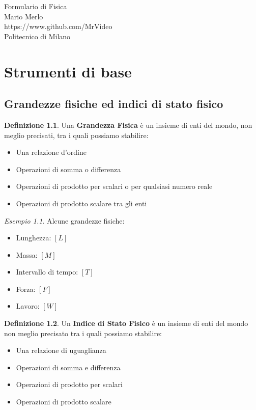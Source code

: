 \documentclass[a4paper, 12pt]{report}
\theoremstyle{definition}
\newtheorem{definition}{Definizione}[chapter]
\theoremstyle{remark}
\newtheorem{example}{Esempio}[definition]
\theoremstyle{plain}
\begin{document}
\begin{titlepage}
    \begin{center}
        \vspace*{5cm}
        \Huge{Formulario di Fisica}\\[1cm]
        \Large{Mario Merlo}\\
        \Large{https://www.github.com/MrVideo}\\
        \Large{Politecnico di Milano}\\[7,5cm]
    \end{center}
    \doclicenseThis
\end{titlepage}

\chapter{Strumenti di base}

\section{Grandezze fisiche ed indici di stato fisico}

\begin{definition}
    Una {\bf Grandezza Fisica} è un insieme di enti del mondo, non meglio precisati, tra i quali possiamo stabilire:
    \begin{itemize}
        \item Una relazione d'ordine
        \item Operazioni di somma o differenza
        \item Operazioni di prodotto per scalari o per qualsiasi numero reale
        \item Operazioni di prodotto scalare tra gli enti
    \end{itemize}
\end{definition}

\begin{example}
    Alcune grandezze fisiche:
    \begin{itemize}
        \item Lunghezza: $[L]$
        \item Massa: $[M]$
        \item Intervallo di tempo: $[T]$
        \item Forza: $[F]$
        \item Lavoro: $[W]$
    \end{itemize}
\end{example}

\begin{definition}
    Un {\bf Indice di Stato Fisico} è un insieme di enti del mondo non meglio precisato tra i quali possiamo stabilire:
    \begin{itemize}
        \item Una relazione di uguaglianza
        \item Operazioni di somma e differenza
        \item Operazioni di prodotto per scalari
        \item Operazioni di prodotto scalare
    \end{itemize}
\end{definition}
\end{document}
